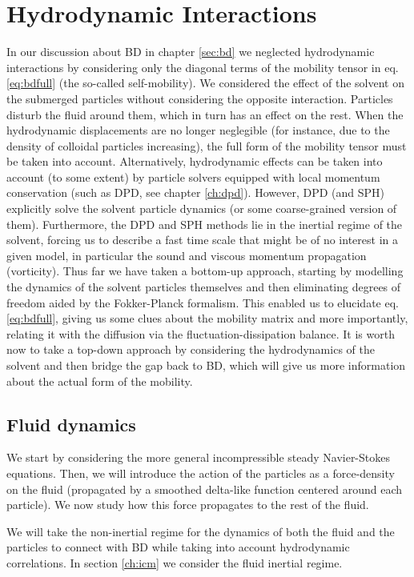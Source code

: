 \documentclass[ twoside,openright,titlepage,numbers=noenddot,%
headinclude,footinclude,cleardoublepage=empty,abstract=on,
BCOR=5mm,paper=a4,fontsize=11pt, dvipsnames
]{scrreprt}
\begin{document}
\chapter{Hydrodynamic Interactions}\label{sec:bdhi}
In our discussion about \gls{BD} in chapter \ref{sec:bd} we neglected hydrodynamic interactions by considering only the diagonal terms of the mobility tensor in eq. \eqref{eq:bdfull} (the so-called self-mobility). We considered the effect of the solvent on the submerged particles without considering the opposite interaction. Particles disturb the fluid around them, which in turn has an effect on the rest. When the hydrodynamic displacements are no longer neglegible (for instance, due to the density of colloidal particles increasing), the full form of the mobility tensor must be taken into account. Alternatively, hydrodynamic effects can be taken into account (to some extent) by particle solvers equipped with local momentum conservation (such as \gls{DPD}, see chapter \ref{ch:dpd}). However, \gls{DPD} (and \gls{SPH}) explicitly solve the solvent particle dynamics (or some coarse-grained version of them). Furthermore, the \gls{DPD} and \gls{SPH} methods lie in the inertial regime of the solvent, forcing us to describe a fast time scale that might be of no interest in a given model, in particular the sound and viscous momentum propagation (vorticity). Thus far we have taken a bottom-up approach, starting by modelling the dynamics of the solvent particles themselves and then eliminating degrees of freedom aided by the Fokker-Planck formalism. This enabled us to elucidate eq. \eqref{eq:bdfull}, giving us some clues about the mobility matrix and more importantly, relating it with the diffusion via the fluctuation-dissipation balance. It is worth now to take a top-down approach by considering the hydrodynamics of the solvent and then bridge the gap back to \gls{BD}, which will give us more information about the actual form of the mobility.
\section*{Fluid dynamics}
We start by considering the more general incompressible steady Navier-Stokes equations. Then, we will introduce the action of the particles as a force-density on the fluid (propagated by a smoothed delta-like function centered around each particle). We now study how this force propagates to the rest of the fluid.

We will take the non-inertial regime for the dynamics of both the fluid and the particles to connect with \gls{BD} while taking into account hydrodynamic correlations. In section \ref{ch:icm} we consider the fluid inertial regime.
\end{document}
